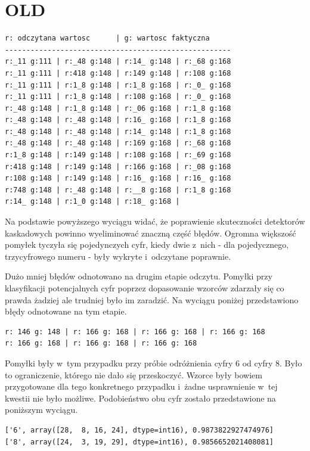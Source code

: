 \chapter{OLD}


\begin{lstlisting}
r: odczytana wartosc      | g: wartosc faktyczna
-----------------------------------------------------
r:_11 g:111 | r:_48 g:148 | r:14_ g:148 | r:_68 g:168
r:_11 g:111 | r:418 g:148 | r:149 g:148 | r:108 g:168
r:_11 g:111 | r:1_8 g:148 | r:1_8 g:168 | r:_0_ g:168
r:_11 g:111 | r:1_8 g:148 | r:108 g:168 | r:_0_ g:168
r:_48 g:148 | r:1_8 g:148 | r:_06 g:168 | r:1_8 g:168
r:_48 g:148 | r:_48 g:148 | r:16_ g:168 | r:1_8 g:168
r:_48 g:148 | r:_48 g:148 | r:14_ g:148 | r:1_8 g:168
r:_48 g:148 | r:_48 g:148 | r:169 g:168 | r:_68 g:168
r:1_8 g:148 | r:149 g:148 | r:108 g:168 | r:_69 g:168
r:418 g:148 | r:149 g:148 | r:166 g:168 | r:_08 g:168
r:108 g:148 | r:149 g:148 | r:16_ g:168 | r:16_ g:168
r:748 g:148 | r:_48 g:148 | r:__8 g:168 | r:1_8 g:168
r:14_ g:148 | r:1_0 g:148 | r:18_ g:168 |
\end{lstlisting}

Na podstawie powyższego wyciągu widać, że poprawienie skuteczności
detektorów kaskadowych powinno wyeliminować znaczną część błędów.
Ogromna większość pomyłek tyczyła się pojedynczych cyfr, kiedy
dwie z~nich - dla pojedycznego, trzycyfrowego numeru - były wykryte
i~odczytane poprawnie.

Dużo mniej błędów odnotowano na drugim etapie odczytu.
Pomyłki przy
klasyfikacji potencjalnych cyfr poprzez dopasowanie wzorców zdarzały 
się co prawda żadziej ale trudniej było im zaradzić.
Na wyciągu poniżej przedstawiono błędy odnotowane na tym etapie.

\begin{lstlisting}
r: 146 g: 148 | r: 166 g: 168 | r: 166 g: 168 | r: 166 g: 168
r: 166 g: 168 | r: 166 g: 168 | r: 166 g: 168
\end{lstlisting}

Pomyłki były w~tym przypadku przy próbie odróżnienia 
cyfry 6 od cyfry 8. Było to ograniczenie, którego 
nie dało się przeskoczyć. Wzorce były bowiem przygotowane dla tego 
konkretnego przypadku i~żadne usprawnienie w~tej kwestii nie było
możliwe. Podobieństwo obu cyfr zostało przedstawione 
na poniższym wyciągu.

\begin{lstlisting}
['6', array([28,  8, 16, 24], dtype=int16), 0.9873822927474976]
['8', array([24,  3, 19, 29], dtype=int16), 0.9856652021408081]
\end{lstlisting}

